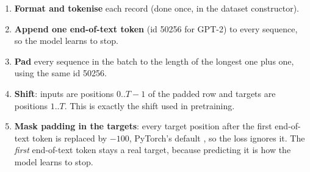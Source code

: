 \begin{enumerate}
\item \textbf{Format and tokenise} each record (done once, in the dataset constructor).
\item \textbf{Append one end-of-text token} (id 50256 for GPT-2) to every sequence, so the
model learns to stop.
\item \textbf{Pad} every sequence in the batch to the length of the longest one plus one,
using the same id 50256.
\item \textbf{Shift}: inputs are positions $0..T-1$ of the padded row and targets are
positions $1..T$. This is exactly the shift used in pretraining.
\item \textbf{Mask padding in the targets}: every target position after the first
end-of-text token is replaced by $-100$, PyTorch's default , so the
loss ignores it. The \emph{first} end-of-text token stays a real target, because
predicting it is how the model learns to stop.
\end{enumerate}

